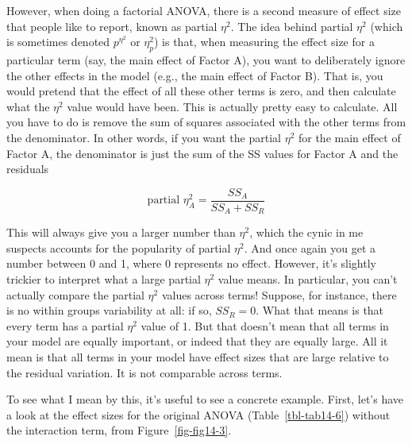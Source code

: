 \documentclass[
  a4paper,
]{book}
\begin{document}
However, when doing a factorial ANOVA, there is a second measure of
effect size that people like to report, known as partial \(\eta^2\). The
idea behind partial \(\eta^2\) (which is sometimes denoted
\(p^{\eta^2}\) or \(\eta_p^2\)) is that, when measuring the effect size
for a particular term (say, the main effect of Factor A), you want to
deliberately ignore the other effects in the model (e.g., the main
effect of Factor B). That is, you would pretend that the effect of all
these other terms is zero, and then calculate what the \(\eta^2\) value
would have been. This is actually pretty easy to calculate. All you have
to do is remove the sum of squares associated with the other terms from
the denominator. In other words, if you want the partial \(\eta^2\) for
the main effect of Factor A, the denominator is just the sum of the SS
values for Factor A and the residuals

\[\text{partial }\eta_A^2= \frac{SS_A}{SS_A+SS_R}\]

This will always give you a larger number than \(\eta^2\), which the
cynic in me suspects accounts for the popularity of partial \(\eta^2\).
And once again you get a number between 0 and 1, where 0 represents no
effect. However, it's slightly trickier to interpret what a large
partial \(\eta^2\) value means. In particular, you can't actually
compare the partial \(\eta^2\) values across terms! Suppose, for
instance, there is no within groups variability at all: if so,
\(SS_R = 0\). What that means is that every term has a partial
\(\eta^2\) value of 1. But that doesn't mean that all terms in your
model are equally important, or indeed that they are equally large. All
it mean is that all terms in your model have effect sizes that are large
relative to the residual variation. It is not comparable across terms.

To see what I mean by this, it's useful to see a concrete example.
First, let's have a look at the effect sizes for the original ANOVA
(Table~\ref{tbl-tab14-6}) without the interaction term, from
Figure~\ref{fig-fig14-3}.

\hypertarget{tbl-tab14-6}{}
 
  \providecommand{\huxb}[2]{\arrayrulecolor[RGB]{#1}\global\arrayrulewidth=#2pt}
  \providecommand{\huxvb}[2]{\color[RGB]{#1}\vrule width #2pt}
  \providecommand{\huxtpad}[1]{\rule{0pt}{#1}}
  \providecommand{\huxbpad}[1]{\rule[-#1]{0pt}{#1}}
\end{document}
